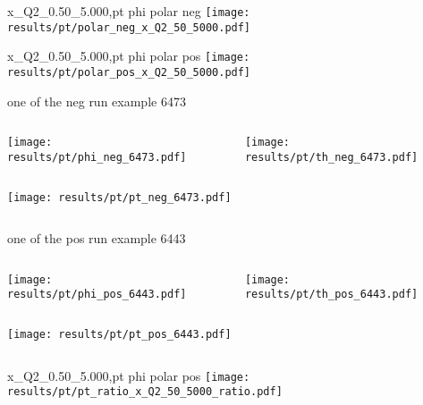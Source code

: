 \begin{frame}{x\_Q2\_0.50\_5.000,pt phi polar neg}
\texttt{[image: results/pt/polar\_neg\_x\_Q2\_50\_5000.pdf]}
\end{frame}
\begin{frame}{x\_Q2\_0.50\_5.000,pt phi polar pos}
\texttt{[image: results/pt/polar\_pos\_x\_Q2\_50\_5000.pdf]}
\end{frame}
\begin{frame}{one of the neg run example 6473}
\begin{columns}
\begin{column}[T]{0.5\textwidth}
\texttt{[image: results/pt/phi\_neg\_6473.pdf]}
\end{column}
\begin{column}[T]{0.5\textwidth}
\texttt{[image: results/pt/th\_neg\_6473.pdf]}
\end{column}
\end{columns}
\begin{columns}
\begin{column}[T]{0.5\textwidth}
\texttt{[image: results/pt/pt\_neg\_6473.pdf]}
\end{column}
\begin{column}[T]{0.5\textwidth}
\end{column}
\end{columns}
\end{frame}
\begin{frame}{one of the pos run example 6443}
\begin{columns}
\begin{column}[T]{0.5\textwidth}
\texttt{[image: results/pt/phi\_pos\_6443.pdf]}
\end{column}
\begin{column}[T]{0.5\textwidth}
\texttt{[image: results/pt/th\_pos\_6443.pdf]}
\end{column}
\end{columns}
\begin{columns}
\begin{column}[T]{0.5\textwidth}
\texttt{[image: results/pt/pt\_pos\_6443.pdf]}
\end{column}
\begin{column}[T]{0.5\textwidth}
\end{column}
\end{columns}
\end{frame}
\begin{frame}{x\_Q2\_0.50\_5.000,pt phi polar pos}
\texttt{[image: results/pt/pt\_ratio\_x\_Q2\_50\_5000\_ratio.pdf]}
\end{frame}
